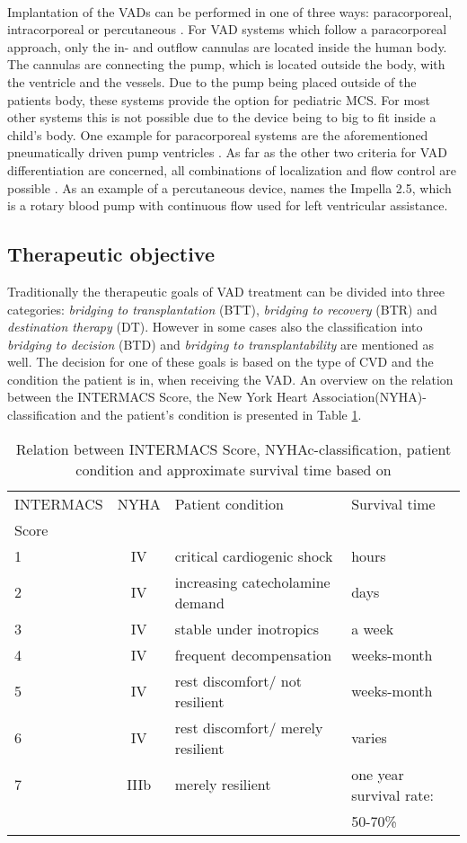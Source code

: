 \\Implantation of the VADs can be performed in one of three ways: paracorporeal, intracorporeal or percutaneous \cite{VAD7}. For VAD systems which follow a paracorporeal approach, only the in- and outflow cannulas are located inside the human body. The cannulas are connecting the pump, which is located outside the body, with the ventricle and the vessels. Due to the pump being placed outside of the patients body, these systems provide the option for pediatric MCS. For most other systems this is not possible due to the device being to big to fit inside a child's body. \cite{VAD10} One example for paracorporeal systems are the aforementioned pneumatically driven pump ventricles \cite{VAD1}. As far as the other two criteria for VAD differentiation are concerned, all combinations of localization and flow control are possible \cite{VAD10}. As an example of a percutaneous device, \cite{VAD7} names the Impella 2.5, which is a rotary blood pump with continuous flow used for left ventricular assistance.

\subsection{Therapeutic objective}
Traditionally the therapeutic goals of VAD treatment can be divided into three categories: \textit{bridging to transplantation} (BTT), \textit{bridging to recovery} (BTR) and \textit{destination therapy} (DT). However in some cases also the classification into \textit{bridging to decision} (BTD) and \textit{bridging to transplantability} are mentioned as well. The decision for one of these goals is based on the type of CVD and the condition the patient is in, when receiving the VAD.\cite{VAD6} An overview on the relation between the INTERMACS Score, the New York Heart Association(NYHA)-classification and the patient's condition is presented in Table \ref{tab:Table1}.
\begin{table}
  \begin{tabularx}{\textwidth}{l|c|l|l}
    \toprule
    INTERMACS & NYHA & Patient condition & Survival time  \\
    Score & & &\\
    \midrule
    1 & IV & critical cardiogenic shock & hours \\
    2 & IV & increasing catecholamine demand & days \\
    3 & IV & stable under inotropics & a week \\
    4 & IV & frequent decompensation & weeks-month \\
    5 & IV & rest discomfort/ not resilient & weeks-month \\
    6 & IV & rest discomfort/ merely resilient & varies \\
    7 & IIIb & merely resilient & one year survival rate: \\
     & & & 50-70\% \\
     \bottomrule
  \end{tabularx}
  \caption{Relation between INTERMACS Score, NYHAc-classification, patient condition and approximate survival time based on \cite{VAD5}}
  \label{tab:Table1}
\end{table}


